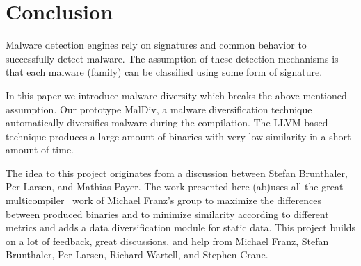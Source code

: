 \documentclass[10pt, preprint]{sigplanconf}
\begin{document}
\section{Conclusion}\label{sec:concl}

Malware detection engines rely on signatures and common behavior to
successfully detect malware. The assumption of these detection mechanisms is
that each malware (family) can be classified using some form of signature.

In this paper we introduce malware diversity which breaks the above mentioned
assumption. Our prototype MalDiv, a malware diversification technique
automatically diversifies malware during the compilation. The LLVM-based
technique produces a large amount of binaries with very low similarity in a
short amount of time.

\acks

The idea to this project originates from a discussion between Stefan Brunthaler,
Per Larsen, and Mathias Payer. The work presented here (ab)uses all the great
multicompiler~\cite{multicompiler} work of Michael Franz's group to maximize the
differences between produced binaries and to minimize similarity according to
different metrics and adds a data diversification module for static data. This
project builds on a lot of feedback, great discussions, and help from Michael
Franz, Stefan Brunthaler, Per Larsen, Richard Wartell, and Stephen Crane.


{%
\linespread{0.85}


}
\end{document}
